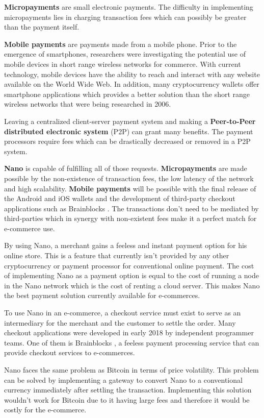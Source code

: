 \documentclass{ferseminar}
\begin{document}
\textbf{Micropayments} are small electronic payments. The difficulty in implementing micropayments lies in charging transaction fees which can possibly be greater than the payment itself.

\textbf{Mobile payments} are payments made from a mobile phone. Prior to the emergence of smartphones, researchers were investigating the potential use of mobile devices in short range wireless networks for commerce. With current technology, mobile devices have the ability to reach and interact with any website available on the World Wide Web. In addition, many cryptocurrency wallets offer smartphone applications which provides a better solution than the short range wireless networks that were being researched in 2006.  

Leaving a centralized client-server payment system and making a \textbf{Peer-to-Peer distributed electronic system} (P2P) can grant many benefits. The payment processors require fees which can be drastically decreased or removed in a P2P system.

\textbf{Nano} is capable of fulfilling all of those requests. \textbf{Micropayments} are made possible by the non-existence of transaction fees, the low latency of the network and high scalability. \textbf{Mobile payments} will be possible with the final release of the Android and iOS wallets and the development of third-party checkout applications such as Brainblocks \cite{Brainblocks}. The transactions don't need to be mediated by third-parties which in synergy with non-existent fees make it a perfect match for e-commerce use.

By using Nano, a merchant gains a feeless and instant payment option for his online store. This is a feature that currently isn't provided by any other cryptocurrency or payment processor for conventional online payment. The cost of implementing Nano as a payment option is equal to the cost of running a node in the Nano network which is the cost of renting a cloud server. This makes Nano the best payment solution currently available for e-commerces.

To use Nano in an e-commerce, a checkout service must exist to serve as an intermediary for the merchant and the customer to settle the order. Many checkout applications were developed in early 2018 by independent programmer teams. One of them is Brainblocks \cite{Brainblocks}, a feeless payment processing service that can provide checkout services to e-commerces.

Nano faces the same problem as Bitcoin in terms of price volatility. This problem can be solved by implementing a gateway to convert Nano to a conventional currency immediately after settling the transaction. Implementing this solution wouldn't work for Bitcoin due to it having large fees and therefore it would be costly for the e-commerce. 
\end{document}
